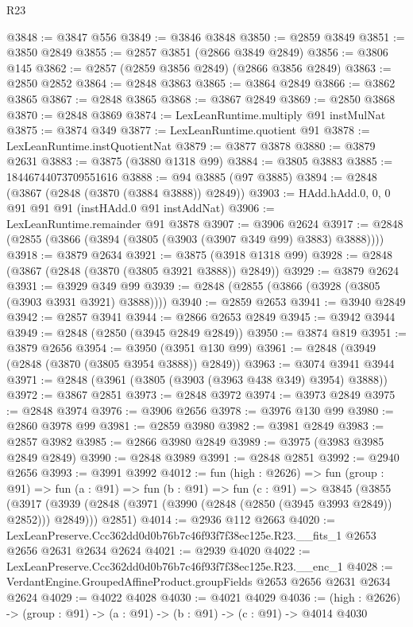 \begin{lexlean}{R23}
\begin{coremodule}
@3848 := @3847 @556
@3849 := @3846 @3848
@3850 := @2859 @3849
@3851 := @3850 @2849
@3855 := @2857 @3851 (@2866 @3849 @2849)
@3856 := @3806 @145
@3862 := @2857 (@2859 @3856 @2849) (@2866 @3856 @2849)
@3863 := @2850 @2852
@3864 := @2848 @3863
@3865 := @3864 @2849
@3866 := @3862 @3865
@3867 := @2848 @3865
@3868 := @3867 @2849
@3869 := @2850 @3868
@3870 := @2848 @3869
@3874 := LexLeanRuntime.multiply @91 instMulNat
@3875 := @3874 @349
@3877 := LexLeanRuntime.quotient @91
@3878 := LexLeanRuntime.instQuotientNat
@3879 := @3877 @3878
@3880 := @3879 @2631
@3883 := @3875 (@3880 @1318 @99)
@3884 := @3805 @3883
@3885 := 18446744073709551616
@3888 := @94 @3885 (@97 @3885)
@3894 := @2848 (@3867 (@2848 (@3870 (@3884 @3888)) @2849))
@3903 := HAdd.hAdd.{0, 0, 0} @91 @91 @91 (instHAdd.{0} @91 instAddNat)
@3906 := LexLeanRuntime.remainder @91 @3878
@3907 := @3906 @2624
@3917 := @2848 (@2855 (@3866 (@3894 (@3805 (@3903 (@3907 @349 @99) @3883) @3888))))
@3918 := @3879 @2634
@3921 := @3875 (@3918 @1318 @99)
@3928 := @2848 (@3867 (@2848 (@3870 (@3805 @3921 @3888)) @2849))
@3929 := @3879 @2624
@3931 := @3929 @349 @99
@3939 := @2848 (@2855 (@3866 (@3928 (@3805 (@3903 @3931 @3921) @3888))))
@3940 := @2859 @2653
@3941 := @3940 @2849
@3942 := @2857 @3941
@3944 := @2866 @2653 @2849
@3945 := @3942 @3944
@3949 := @2848 (@2850 (@3945 @2849 @2849))
@3950 := @3874 @819
@3951 := @3879 @2656
@3954 := @3950 (@3951 @130 @99)
@3961 := @2848 (@3949 (@2848 (@3870 (@3805 @3954 @3888)) @2849))
@3963 := @3074 @3941 @3944
@3971 := @2848 (@3961 (@3805 (@3903 (@3963 @438 @349) @3954) @3888))
@3972 := @3867 @2851
@3973 := @2848 @3972
@3974 := @3973 @2849
@3975 := @2848 @3974
@3976 := @3906 @2656
@3978 := @3976 @130 @99
@3980 := @2860 @3978 @99
@3981 := @2859 @3980
@3982 := @3981 @2849
@3983 := @2857 @3982
@3985 := @2866 @3980 @2849
@3989 := @3975 (@3983 @3985 @2849 @2849)
@3990 := @2848 @3989
@3991 := @2848 @2851
@3992 := @2940 @2656
@3993 := @3991 @3992
@4012 := fun (high : @2626) =>
  fun (group : @91) =>
  fun (a : @91) =>
  fun (b : @91) =>
  fun (c : @91) =>
  @3845
    (@3855
      (@3917 (@3939 (@2848 (@3971 (@3990 (@2848 (@2850 (@3945 @3993 @2849)) @2852))) @2849)))
      @2851)
@4014 := @2936 @112 @2663
@4020 := LexLeanPreserve.Ccc362dd0d0b76b7c46f93f7f38ec125e.R23.__fits_1
    @2653
    @2656
    @2631
    @2634
    @2624
@4021 := @2939 @4020
@4022 := LexLeanPreserve.Ccc362dd0d0b76b7c46f93f7f38ec125e.R23.__enc_1
@4028 := VerdantEngine.GroupedAffineProduct.groupFields @2653 @2656 @2631 @2634 @2624
@4029 := @4022 @4028
@4030 := @4021 @4029
@4036 := (high : @2626) -> (group : @91) -> (a : @91) -> (b : @91) -> (c : @91) -> @4014 @4030

\end{coremodule}
\end{lexlean}
